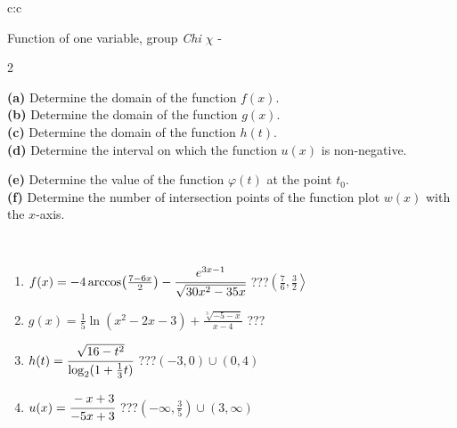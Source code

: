 \documentclass[10pt]{report}
\begin{document}
\begin{tabular}{c:c}
\begin{minipage}[c][104.5mm][t]{0.5\linewidth}
\begin{center}
\vspace{7mm}
{\huge Function of one variable, group \textit{Chi $\chi$} -}\\[5mm]
\begin{minipage}{0.95\linewidth}
\begin{center}
{\small \begin{multicols}{2} \raggedright
\textbf{(a)} Determine the domain of the function \(f(x)\). \\[1mm]
\textbf{(b)} Determine the domain of the function \(g(x)\). \\[1mm]
\textbf{(c)} Determine the domain of the function \(h(t)\). \\[1mm]
\textbf{(d)} Determine the interval on which the function \(u(x)\) is non-negative. \par \columnbreak
\textbf{(e)} Determine the value of the function \(\varphi(t)\) at the point \(t_0\). \\[1mm]
\textbf{(f)} Determine the number of intersection points of the function plot \(w(x)\) with the \(x\)-axis. \\[1mm]
\end{multicols}
}
\end{center}
\end{minipage}
\\[4mm]
\begin{minipage}{0.79\linewidth}
\begin{center}
\begin{varwidth}{\linewidth}
\begin{enumerate}
\small
\item $f(x) = -4\arccos\!\left( \frac{7-6x}{2} \right) - \cfrac{e^{3x-1}}{\sqrt{30x^2-35x}}$\quad \dotfill\; ???\;\dotfill \quad $\left(\frac{7}{6} , \frac{3}{2}\right\rangle$
\item $g(x) = \frac{1}{5} \ln{\!(x^2-2x-3)}+\frac{\sqrt[3]{-5-x}}{x-4}$\quad \dotfill\; ???\;\dotfill {}
\item $h(t) = \cfrac{\sqrt{16-t^2}}{\log_2(1+\frac{1}{3}t)}$\quad \dotfill\; ???\;\dotfill \quad $\left(-3 , 0\right)\cup\left(0 , 4\right)$
\item $u(x) = \cfrac{-x+3}{-5x+3}$\quad \dotfill\; ???\;\dotfill \quad $\left(-\infty , \frac{3}{5}\right)\cup\left(3 , \infty\right)$

\end{enumerate}
\end{varwidth}
\end{center}
\end{minipage}
\end{center}
\end{minipage}
\end{tabular}
\end{document}
